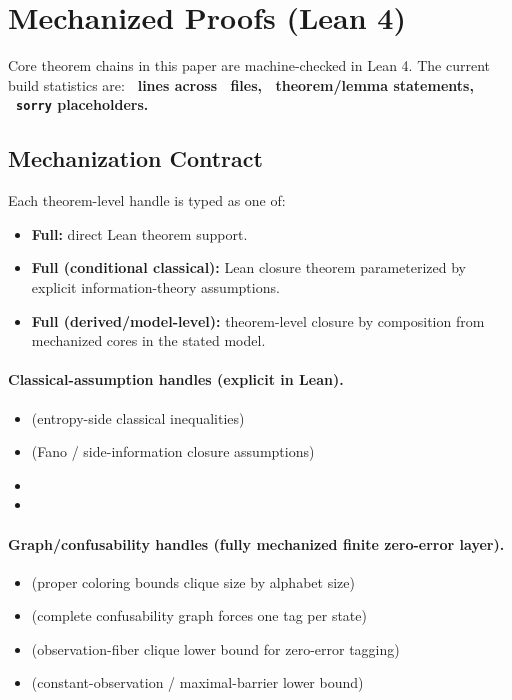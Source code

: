 \section*{Mechanized Proofs (Lean 4)}\label{sec:lean}

Core theorem chains in this paper are machine-checked in Lean 4. The current build statistics are:
\textbf{\LeanTotalLines\ lines across \LeanTotalFiles\ files, \LeanTotalTheorems\ theorem/lemma statements, \LeanTotalSorry\ \texttt{sorry} placeholders.}

\subsection*{Mechanization Contract}

Each theorem-level handle is typed as one of:
\begin{itemize}
\item \textbf{Full:} direct Lean theorem support.
\item \textbf{Full (conditional classical):} Lean closure theorem parameterized by explicit information-theory assumptions.
\item \textbf{Full (derived/model-level):} theorem-level closure by composition from mechanized cores in the stated model.
\end{itemize}

\paragraph{Classical-assumption handles (explicit in Lean).}
\begin{itemize}
\item {} (entropy-side classical inequalities)
\item {} (Fano / side-information closure assumptions)
\item {}
\item {}
\end{itemize}

\paragraph{Graph/confusability handles (fully mechanized finite zero-error layer).}
\begin{itemize}
\item {} (proper coloring bounds clique size by alphabet size)
\item {} (complete confusability graph forces one tag per state)
\item {} (observation-fiber clique lower bound for zero-error tagging)
\item {} (constant-observation / maximal-barrier lower bound)
\end{itemize}

